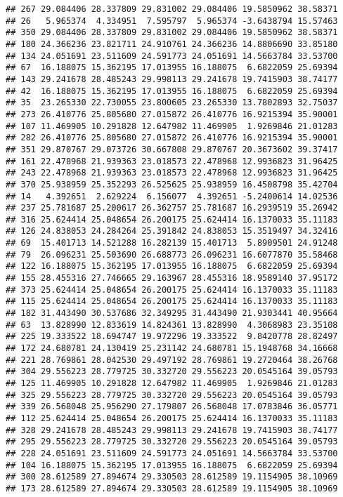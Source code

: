 \documentclass[
]{article}
\begin{document}
\begin{verbatim}
## 267 29.084406 28.337809 29.831002 29.084406 19.5850962 38.58371
## 26   5.965374  4.334951  7.595797  5.965374 -3.6438794 15.57463
## 350 29.084406 28.337809 29.831002 29.084406 19.5850962 38.58371
## 180 24.366236 23.821711 24.910761 24.366236 14.8806690 33.85180
## 134 24.051691 23.511609 24.591773 24.051691 14.5663784 33.53700
## 67  16.188075 15.362195 17.013955 16.188075  6.6822059 25.69394
## 143 29.241678 28.485243 29.998113 29.241678 19.7415903 38.74177
## 42  16.188075 15.362195 17.013955 16.188075  6.6822059 25.69394
## 35  23.265330 22.730055 23.800605 23.265330 13.7802893 32.75037
## 273 26.410776 25.805680 27.015872 26.410776 16.9215394 35.90001
## 107 11.469905 10.291828 12.647982 11.469905  1.9269846 21.01283
## 282 26.410776 25.805680 27.015872 26.410776 16.9215394 35.90001
## 351 29.870767 29.073726 30.667808 29.870767 20.3673602 39.37417
## 161 22.478968 21.939363 23.018573 22.478968 12.9936823 31.96425
## 243 22.478968 21.939363 23.018573 22.478968 12.9936823 31.96425
## 370 25.938959 25.352293 26.525625 25.938959 16.4508798 35.42704
## 14   4.392651  2.629224  6.156077  4.392651 -5.2400614 14.02536
## 237 25.781687 25.200617 26.362757 25.781687 16.2939519 35.26942
## 316 25.624414 25.048654 26.200175 25.624414 16.1370033 35.11183
## 126 24.838053 24.284264 25.391842 24.838053 15.3519497 34.32416
## 69  15.401713 14.521288 16.282139 15.401713  5.8909501 24.91248
## 79  26.096231 25.503690 26.688773 26.096231 16.6077870 35.58468
## 122 16.188075 15.362195 17.013955 16.188075  6.6822059 25.69394
## 155 28.455316 27.746665 29.163967 28.455316 18.9589140 37.95172
## 373 25.624414 25.048654 26.200175 25.624414 16.1370033 35.11183
## 115 25.624414 25.048654 26.200175 25.624414 16.1370033 35.11183
## 182 31.443490 30.537686 32.349295 31.443490 21.9303441 40.95664
## 63  13.828990 12.833619 14.824361 13.828990  4.3068983 23.35108
## 225 19.333522 18.694747 19.972296 19.333522  9.8420778 28.82497
## 172 24.680781 24.130419 25.231142 24.680781 15.1948768 34.16668
## 221 28.769861 28.042530 29.497192 28.769861 19.2720464 38.26768
## 304 29.556223 28.779725 30.332720 29.556223 20.0545164 39.05793
## 125 11.469905 10.291828 12.647982 11.469905  1.9269846 21.01283
## 325 29.556223 28.779725 30.332720 29.556223 20.0545164 39.05793
## 339 26.568048 25.956290 27.179807 26.568048 17.0783846 36.05771
## 112 25.624414 25.048654 26.200175 25.624414 16.1370033 35.11183
## 328 29.241678 28.485243 29.998113 29.241678 19.7415903 38.74177
## 295 29.556223 28.779725 30.332720 29.556223 20.0545164 39.05793
## 228 24.051691 23.511609 24.591773 24.051691 14.5663784 33.53700
## 104 16.188075 15.362195 17.013955 16.188075  6.6822059 25.69394
## 300 28.612589 27.894674 29.330503 28.612589 19.1154905 38.10969
## 173 28.612589 27.894674 29.330503 28.612589 19.1154905 38.10969
\end{verbatim}
\end{document}
